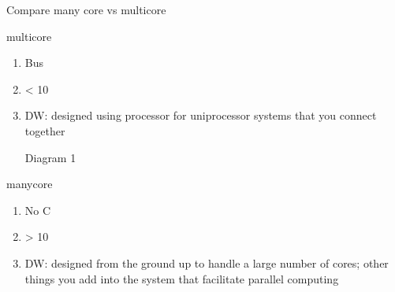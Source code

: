 Compare many core vs multicore

multicore
\begin{enumerate}
    \item Bus
    \item < 10
    \item DW: designed using processor for uniprocessor systems that you connect together
    \item [Diagram 1]
\end{enumerate}

manycore
\begin{enumerate}
    \item No C
    \item > 10
    \item DW: designed from the ground up to handle a large number of cores; other things you add into the system that facilitate parallel computing
\end{enumerate}

